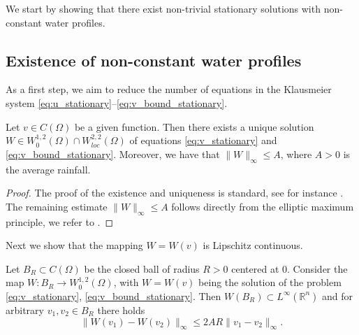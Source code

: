 \documentclass[review,onefignum,onetabnum]{SIAM-styles/siamart171218}
\begin{document}
We start by showing that there exist non-trivial stationary solutions with non-constant water profiles. 

\subsection{Existence of non-constant water profiles}

As a first step, we aim to reduce the number of equations in the Klausmeier system \eqref{eq:u_stationary}--\eqref{eq:v_bound_stationary}. 
 
\begin{lem}
    \label{lem:existence_of_inhomogeneous_elliptic_v}
    Let $v \in C(\Omega)$ be a given function. Then there exists a unique solution $W \in W^{1,2}_0(\Omega) \cap W^{2,2}_{loc}(\Omega)$ of equations \eqref{eq:v_stationary} and \eqref{eq:v_bound_stationary}. Moreover, we have that $\|W \|_\infty \leq A$, where $A >0$ is the average rainfall. 
\end{lem}
\begin{proof}
    The proof of the existence and uniqueness is standard, see for instance \cite[Theorem 8.9]{gilbarg2001elliptic}. The remaining estimate $\|W\|_\infty \leq A$ follows directly from the elliptic maximum principle, we refer to \cite[Chapter 3]{gilbarg2001elliptic}.
\end{proof}

Next we show that the mapping $W = W(v)$ is Lipschitz continuous.
\begin{lem}
    \label{lem:stationary_v_lipschitz_constant}
    Let $B_R \subset C(\Omega)$ be the closed ball of radius $R > 0$ centered at $0$. 
    Consider the map $W : B_R \rightarrow W^{1,2}_0(\Omega)$, with $W=W(v)$ being the solution of the problem \eqref{eq:v_stationary}, \eqref{eq:v_bound_stationary}. Then $W (B_R) \subset L^\infty(\mathbb{R}^n)$ and for arbitrary $v_1, v_2 \in B_R$ there holds
    \begin{equation}
        \|W(v_1) - W(v_2)\|_\infty \leq 2 A R \|v_1 - v_2\|_\infty.
    \end{equation}
\end{lem}
\end{document}
